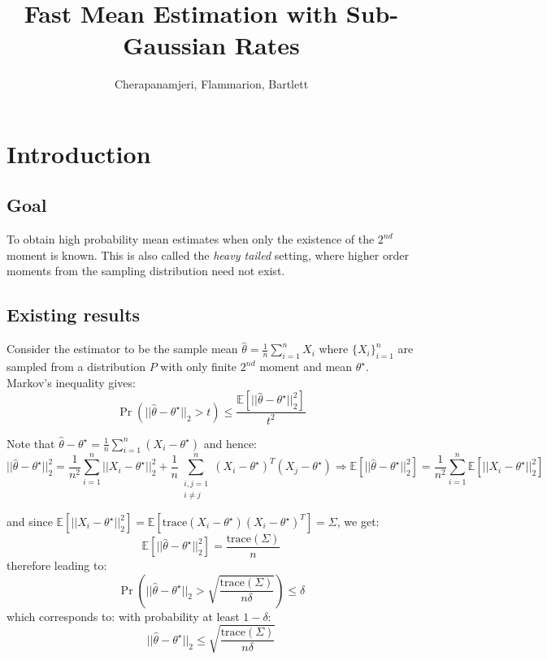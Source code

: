 \documentclass{article}
\title{Fast Mean Estimation with Sub-Gaussian Rates}
\author{Cherapanamjeri, Flammarion, Bartlett}
\date{}
\theoremstyle{remark}
\theoremstyle{defintiion}
\newcommand{\Exp}{\mathbb{E}}
\newcommand{\trace}{\mathrm{trace}}
\newcommand{\eparam}{\widehat{\theta}}
\newcommand{\tparam}{\theta^{\star}}
\begin{document}
\maketitle

\raggedright

\section{Introduction}
\subsection{Goal}
To obtain high probability mean estimates when only the existence of the \(2^{nd}\) moment is known. This is also called the \emph{heavy tailed} setting, where higher order moments from the sampling distribution need not exist.

\subsection{Existing results}
Consider the estimator to be the sample mean \(\eparam = \frac{1}{n}\sum\limits_{i=1}^{n}X_{i}\) where \(\{X_{i}\}_{i=1}^{n}\) are sampled from a distribution \(P\) with only finite \(2^{nd}\) moment and mean \(\tparam\). Markov's inequality gives:
\begin{equation*}
\Pr(||\eparam - \tparam||_{2} > t) \leq \frac{\Exp[||\eparam - \tparam||^{2}_{2}]}{t^{2}}
\end{equation*}

Note that \(\eparam - \tparam = \frac{1}{n}\sum\limits_{i=1}^{n}(X_{i} - \tparam)\) and hence:
\begin{equation*}
||\eparam - \tparam||_{2}^{2} = \frac{1}{n^{2}}\sum_{i=1}^{n} ||X_{i} - \tparam||_{2}^{2} + \frac{1}{n}\sum_{\substack{i, j = 1 \\ i \neq j}}^{n} (X_{i} - \tparam)^{T}(X_{j} - \tparam) \Rightarrow \Exp[||\eparam - \tparam||_{2}^{2}] = \frac{1}{n^{2}}\sum_{i=1}^{n} \Exp\left[||X_{i} - \tparam||_{2}^{2}\right]
\end{equation*}

and since \(\Exp\left[||X_{i} - \tparam||_{2}^{2}\right] = \Exp\left[\trace(X_{i} - \tparam)(X_{i} - \tparam)^{T}\right] = \Sigma\), we get:
\begin{equation*}
\Exp[||\eparam - \tparam||_{2}^{2}] = \frac{\trace(\Sigma)}{n}
\end{equation*}
therefore leading to:
\begin{equation*}
\Pr\left(||\eparam - \tparam||_{2} > \sqrt{\frac{\trace(\Sigma)}{n\delta}}\right) \leq \delta
\end{equation*}
which corresponds to: with probability at least \(1 - \delta\):
\begin{equation*}
||\eparam - \tparam||_{2} \leq \sqrt{\frac{\trace(\Sigma)}{n\delta}}
\end{equation*}
\end{document}
